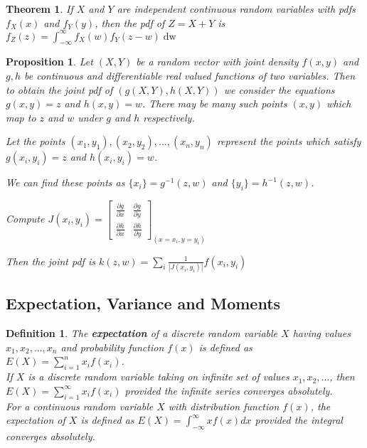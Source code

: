 \documentclass[12pt,twoside]{report}
\theoremstyle{thmstyle}
\newtheorem{defn}{Definition}
\newtheorem{thm}{Theorem}
\newtheorem{prop}[subsection]{Proposition}
\begin{document}
\begin{thm}
    If $X$ and $Y$ are independent continuous random variables with pdfs $f_X(x)$ and $f_Y(y)$, then the pdf of $Z = X+Y$ is $f_Z\left (z\right ) = \displaystyle\int_{- \infty}^\infty f_X \left (w\right ) f_Y \left (z - w\right ) \mathop{\mathrm{d} w}$
\end{thm}

\begin{prop}
    Let $(X,Y)$ be a random vector with joint density $f(x,y)$ and $g,h$ be continuous and differentiable real valued functions of two variables. Then to obtain the joint pdf of $(g(X,Y), h(X,Y))$ we consider the equations $g(x,y) = z$ and $h(x,y) = w$. There may be many such points $(x,y)$ which map to $z$ and $w$ under $g$ and $h$ respectively.

    Let the points $(x_1, y_1), (x_2, y_2), ..., (x_n, y_n)$ represent the points which satisfy $g(x_i, y_i) = z$ and $h(x_i, y_i) = w$.

    We can find these points as $\{x_i\} = g^{-1}(z,w)$ and $\{ y_i \} = h^{-1}(z,w)$.

    Compute $J(x_i, y_i) = \begin{bmatrix} \frac{\partial g}{\partial x} & \frac{\partial g}{\partial y} \\ \frac{\partial h}{\partial x} & \frac{\partial h}{\partial y} \end{bmatrix}_{(x = x_i, y = y_i)}$

        Then the joint pdf is $k(z,w) = \displaystyle \sum_i \frac{1}{|J(x_i, y_i)|} f(x_i, y_i)$
\end{prop}

\subsection{Expectation, Variance and Moments}

\begin{defn}
    The \textbf{expectation} of a discrete random variable $X$ having values $x_1, x_2, ..., x_n$ and probability function $f(x)$ is defined as $E\left (X\right ) = \sum_{i=1}^n x_i f\left (x_i\right )$.
    \\

    If $X$ is a discrete random variable taking on infinite set of values $x_1, x_2, ...$, then $E(X) = \sum_{i=1}^\infty x_i f(x_i)$ provided the infinite series converges absolutely.
    \\

    For a continuous random variable $X$ with distribution function $f(x)$, the expectation of $X$ is defined as $E(X) = \int_{- \infty}^\infty x f(x) dx$ provided the integral converges absolutely.
\end{defn}
\end{document}

